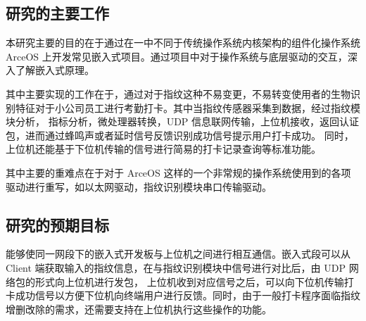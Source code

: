 


\subsection{研究的主要工作}

    本研究主要的目的在于通过在一中不同于传统操作系统内核架构的组件化操作系统 ArceOS 上开发常见嵌入式项目。通过项目中对于操作系统与底层驱动的交互，深入了解嵌入式原理。

    其中主要实现的工作在于，通过对于指纹这种不易变更，不易转变使用者的生物识别特征对于小公司员工进行考勤打卡。其中当指纹传感器采集到数据，经过指纹模块分析，
    指标分析，微处理器转换，UDP 信息联网传输，上位机接收，返回认证包，进而通过蜂鸣声或者延时信号反馈识别成功信号提示用户打卡成功。
    同时，上位机还能基于下位机传输的信号进行简易的打卡记录查询等标准功能。

    其中主要的重难点在于对于 ArceOS 这样的一个非常规的操作系统使用到的各项驱动进行重写，如以太网驱动，指纹识别模块串口传输驱动。

\subsection{研究的预期目标}

    能够使同一网段下的嵌入式开发板与上位机之间进行相互通信。嵌入式段可以从 Client 端获取输入的指纹信息，在与指纹识别模块中信号进行对比后，由 UDP 网络包的形式向上位机进行发包，
    上位机收到对应信号之后，可以向下位机传输打卡成功信号以方便下位机向终端用户进行反馈。同时，由于一般打卡程序面临指纹增删改除的需求，还需要支持在上位机执行这些操作的功能。

